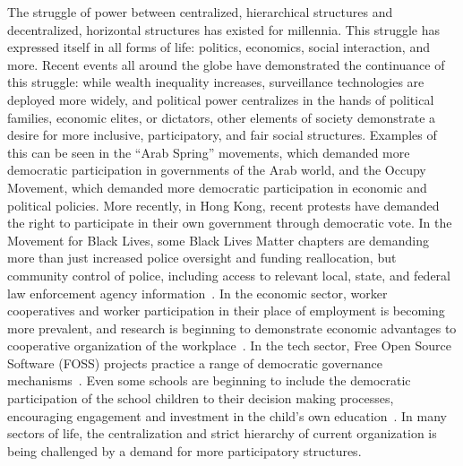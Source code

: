 The struggle of power between centralized, hierarchical structures and
decentralized, horizontal structures has existed for millennia. This struggle
has expressed itself in all forms of life: politics, economics, social
interaction, and more. Recent events all around the globe have demonstrated the
continuance of this struggle: while wealth inequality increases, surveillance
technologies are deployed more widely, and political power centralizes in the
hands of political families, economic elites, or dictators, other elements of society demonstrate a desire for
more inclusive, participatory, and fair social structures. Examples of this can
be seen in the ``Arab Spring'' movements, which demanded more democratic
participation in governments of the Arab world, and the Occupy Movement, which
demanded more democratic participation in economic and political policies. More
recently, in Hong Kong, recent protests have demanded the right to participate in
their own government through democratic vote. In the Movement for Black Lives,
some Black Lives Matter chapters are demanding more than just increased police
oversight and funding reallocation, but community control of police, including
access to relevant local, state, and federal law enforcement agency
information~\cite{m4bl2021}. In the economic sector, worker cooperatives and
worker participation in their place of employment is becoming more prevalent,
and research is beginning to demonstrate economic advantages to cooperative
organization of the
workplace~\cite{jackall19846,wright2014worker, lindenfeld1982workplace}.
In the tech sector, Free Open Source Software (FOSS) projects practice a range
of democratic governance mechanisms~\cite{foss}.
Even some schools are beginning to include the democratic participation of the
school children to their decision making processes, encouraging engagement and
investment in the child's own education~\cite{pacheco2008escola}. In many
sectors of life, the centralization and strict hierarchy of current organization
is being challenged by a demand for more participatory structures.


